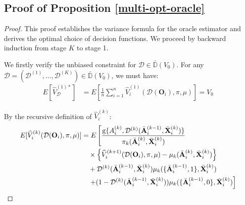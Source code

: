 \documentclass[11pt]{article}
\theoremstyle{referenceplain}
\theoremstyle{referencedefinition}
\theoremstyle{referenceremark}
\begin{document}
\subsection{Proof of Proposition \ref{multi-opt-oracle}}
\begin{proof}
This proof establishes the variance formula for the oracle estimator and derives the optimal choice of decision functions. We proceed by backward induction from stage $K$ to stage 1.


We firstly verify the unbiased constraint for $\mathcal{D} \in \bar{\mathbb{D}}(V_0)$. For any $\mathcal{D} = (\mathcal{D}^{(1)}, \ldots, \mathcal{D}^{(K)}) \in \bar{\mathbb{D}}(V_0)$, we must have:
\begin{align}
    E[\widehat{V}_{\mathcal{D}}^{(1)*}] &= E\left[\frac{1}{n}\sum_{i=1}^n \widehat{V}_i^{(1)}(\mathcal{D}(\mathbf{O}_i),\pi,\mu)\right] = V_0
\end{align}

By the recursive definition of $\widehat{V}_i^{(k)}$:
\begin{align}
    E[\widehat{V}_i^{(k)}(\mathcal{D}(\mathbf{O}_i),\pi,\mu)] &= E\left[\frac{\mathrm{g}\{A_i^{(k)}, \mathcal{D}^{(k)}(\bar{\mathbf{A}}_i^{(k-1)},\bar{\mathbf{X}}_i^{(k)})\}}{\pi_k(\bar{\mathbf{A}}_i^{(k)}, \bar{\mathbf{X}}_i^{(k)})}\right.\notag\\
    &\quad \times \left\{\widehat{V}_i^{(k+1)}(\mathcal{D}(\mathbf{O}_i),\pi,\mu) - \mu_k(\bar{\mathbf{A}}_i^{(k)}, \bar{\mathbf{X}}_i^{(k)})\right\}\notag\\
    &\quad + \mathcal{D}^{(k)}(\bar{\mathbf{A}}_i^{(k-1)},\bar{\mathbf{X}}_i^{(k)}) \mu_k(\{\bar{\mathbf{A}}_i^{(k-1)},1\}, \bar{\mathbf{X}}_i^{(k)})\notag\\
    &\quad\left. + (1-\mathcal{D}^{(k)}(\bar{\mathbf{A}}_i^{(k-1)},\bar{\mathbf{X}}_i^{(k)})) \mu_k(\{\bar{\mathbf{A}}_i^{(k-1)},0\}, \bar{\mathbf{X}}_i^{(k)})\right]
\end{align}


\end{proof}
\end{document}
